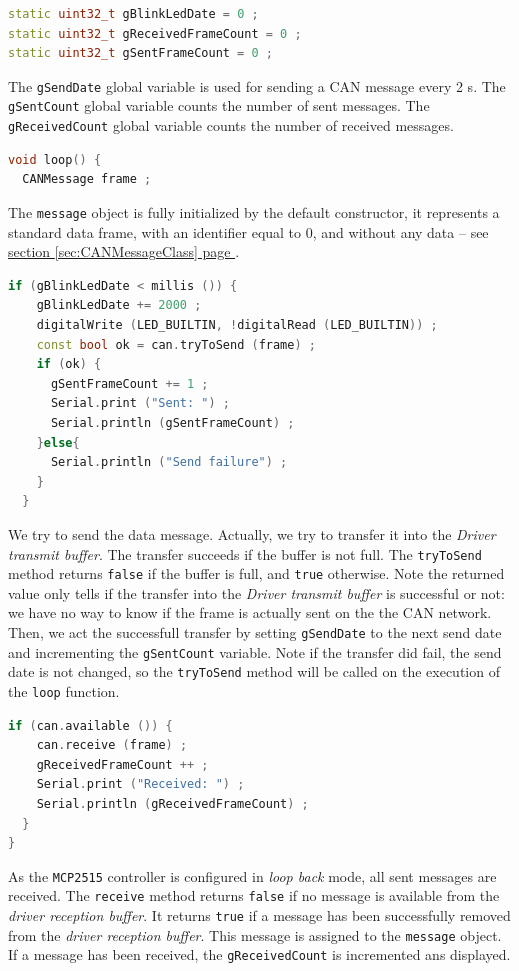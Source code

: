 \documentclass[10pt, a4paper, obeyspaces]{extarticle}
\newcommand\refSectionPage[1]{\hyperref[sec:#1]{section \ref*{sec:#1} page \pageref{sec:#1}}}
\begin{document}
{ \small\begin{lstlisting}[language=c++]
static uint32_t gBlinkLedDate = 0 ;
static uint32_t gReceivedFrameCount = 0 ;
static uint32_t gSentFrameCount = 0 ;
\end{lstlisting}}
The \texttt{gSendDate} global variable is used for sending a CAN message every 2 s. The \texttt{gSentCount} global variable counts the number of sent messages. The \texttt{gReceivedCount} global variable counts the number of received messages.



{ \small\begin{lstlisting}[language=c++]
void loop() {
  CANMessage frame ;
\end{lstlisting}}
The \texttt{message} object is fully initialized by the default constructor, it represents a standard data frame, with an identifier equal to $0$, and without any data -- see \refSectionPage{CANMessageClass}. 







{ \small\begin{lstlisting}[language=c++]
  if (gBlinkLedDate < millis ()) {
    gBlinkLedDate += 2000 ;
    digitalWrite (LED_BUILTIN, !digitalRead (LED_BUILTIN)) ;
    const bool ok = can.tryToSend (frame) ;
    if (ok) {
      gSentFrameCount += 1 ;
      Serial.print ("Sent: ") ;
      Serial.println (gSentFrameCount) ;
    }else{
      Serial.println ("Send failure") ;
    }
  }
\end{lstlisting}}
We try to send the data message. Actually, we try to transfer it into the \emph{Driver transmit buffer}. The transfer succeeds if the buffer is not full. The \texttt{tryToSend} method returns \texttt{false} if the buffer is full, and \texttt{true} otherwise. Note the returned value only tells if the transfer into the \emph{Driver transmit buffer} is successful or not: we have no way to know if the frame is actually sent on the the CAN network. Then, we act the successfull transfer by setting \texttt{gSendDate} to the next send date and incrementing the \texttt{gSentCount} variable. Note if the transfer did fail, the send date is not changed, so the \texttt{tryToSend} method will be called on the execution of the \texttt{loop} function.


{ \small\begin{lstlisting}[language=c++]
  if (can.available ()) {
    can.receive (frame) ;
    gReceivedFrameCount ++ ;
    Serial.print ("Received: ") ;
    Serial.println (gReceivedFrameCount) ;
  }
}
\end{lstlisting}}
As the \texttt{MCP2515} controller is configured in \emph{loop back} mode, all sent messages are received. The \texttt{receive} method returns \texttt{false} if no message is available from the \emph{driver reception buffer}. It returns \texttt{true} if a message has been successfully removed from the \emph{driver reception buffer}. This message is assigned to the \texttt{message} object. If a message has been received, the \texttt{gReceivedCount} is incremented ans displayed.
\end{document}
